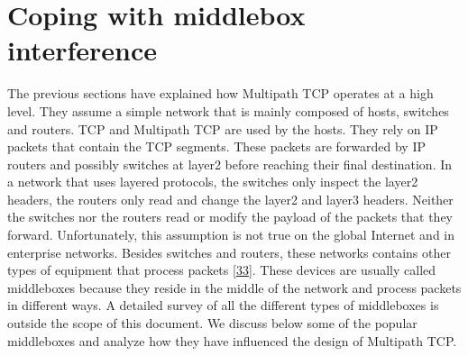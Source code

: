 \documentclass[letterpaper,10pt,english]{sphinxmanual}
\begin{document}
\section{Coping with middlebox interference}
\label{\detokenize{mptcp:coping-with-middlebox-interference}}\label{\detokenize{mptcp:mptcp-middlebox}}
\sphinxAtStartPar
The previous sections have explained how Multipath TCP operates at a high level. They assume a simple network that is mainly composed of hosts, switches and routers. TCP and Multipath TCP are used by the hosts. They rely on IP packets that contain the TCP segments. These packets are forwarded by IP routers and possibly switches at layer\sphinxhyphen{}2 before reaching their final destination. In a network that uses layered protocols, the switches only inspect the layer\sphinxhyphen{}2 headers, the routers only read and change the layer\sphinxhyphen{}2 and layer\sphinxhyphen{}3 headers. Neither the switches nor the routers read or modify the payload of the packets that they forward. Unfortunately, this assumption is not true on the global Internet and in enterprise networks. Besides switches and routers, these networks contains other types of equipment that process packets {[}\hyperlink{cite.biblio:id8916}{33}{]}. These devices are usually called middleboxes because they reside in the middle of the network and process packets in different ways. A detailed survey of all the different types of middleboxes is outside the scope of this document. We discuss below some of the popular middleboxes and analyze how they have influenced the design of Multipath TCP.
\end{document}
